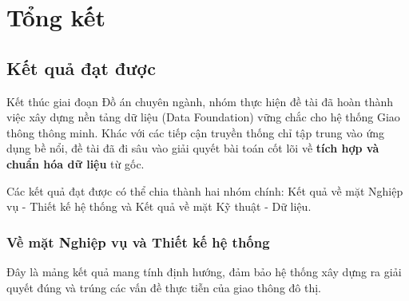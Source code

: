 \section{Tổng kết}
\subsection{Kết quả đạt được}

Kết thúc giai đoạn Đồ án chuyên ngành, nhóm thực hiện đề tài đã hoàn thành việc xây dựng nền tảng dữ liệu (Data Foundation) vững chắc cho hệ thống Giao thông thông minh. Khác với các tiếp cận truyền thống chỉ tập trung vào ứng dụng bề nổi, đề tài đã đi sâu vào giải quyết bài toán cốt lõi về \textbf{tích hợp và chuẩn hóa dữ liệu} từ gốc.

Các kết quả đạt được có thể chia thành hai nhóm chính: Kết quả về mặt Nghiệp vụ - Thiết kế hệ thống và Kết quả về mặt Kỹ thuật - Dữ liệu.

\subsubsection{Về mặt Nghiệp vụ và Thiết kế hệ thống}
Đây là mảng kết quả mang tính định hướng, đảm bảo hệ thống xây dựng ra giải quyết đúng và trúng các vấn đề thực tiễn của giao thông đô thị.

